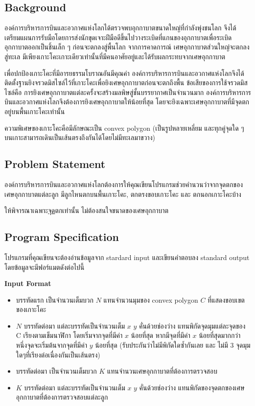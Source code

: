 
\subsection*{\sectionfont\upshape Background}

องค์การบริหารการบินและอวกาศแห่งโลกได้ตรวจพบอุกกาบาตขนาดใหญ่ที่กำลังพุ่งชนโลก 
จึงได้เตรียมแผนการรับมือโดยการส่งนักขุดเจาะฝีมือดีขึ้นไปวางระเบิดที่แกนของอุกกาบาตเพื่อระเบิดอุกกาบาตออกเป็นชิ้นเล็ก ๆ 
ก่อนจะตกลงสู่พื้นโลก จากการคาดการณ์ เศษอุกกาบาตส่วนใหญ่จะตกลงสู่ทะเล 
มีเพียงเกาะโคะเกาะเดียวเท่านั้นที่มีคนอาศัยอยู่และได้รับผลกระทบจากเศษอุกกาบาต

เพื่อปกป้องเกาะโคะที่มีอารยธรรมโบราณอันมีคุณค่า 
องค์การบริหารการบินและอวกาศแห่งโลกจึงได้ติดตั้งฐานยิงจรวดมิสไซล์ไว้ที่เกาะโคะเพื่อยิงเศษอุกกาบาตก่อนจะตกถึงพื้น
ข้อเสียของการใช้จรวดมิสไซล์คือ การยิงเศษอุกกาบาตแต่ละครั้งจะสร้างมลพิษสู่ชั้นบรรยากาศเป็นจำนวนมาก
องค์การบริหารการบินและอวกาศแห่งโลกจึงต้องการยิงเศษอุกกาบาตให้น้อยที่สุด
โดยจะยิงเฉพาะเศษอุกกาบาตที่มีจุดตกอยู่บนพื้นเกาะโคะเท่านั้น

ความพิเศษของเกาะโคะคือมีลักษณะเป็น convex polygon 
(เป็นรูปหลายเหลี่ยม และทุกคู่จุดใด ๆ บนเกาะสามารถเดินเป็นเส้นตรงถึงกันได้โดยไม่มีทะเลมาขวาง)

\subsection*{\sectionfont\upshape Problem Statement}

องค์การบริหารการบินและอวกาศแห่งโลกต้องการให้คุณเขียนโปรแกรมช่วยคำนวนว่าจากจุดตกของเศษอุกกาบาตแต่ละลูก 
มีลูกไหนตกบนพื้นเกาะโคะ, ตกตรงขอบเกาะโคะ และ ตกนอกเกาะโคะบ้าง

ให้พิจารณาเฉพาะ\uline{จุด}ตกเท่านั้น ไม่ต้องสนใจขนาดของเศษอุกกาบาต

\subsection*{\sectionfont\upshape Program Specification}

โปรแกรมที่คุณเขียนจะต้องอ่านข้อมูลจาก stardard input 
และเขียนคำตอบลง standard output โดยข้อมูลจะมีฟอร์แมตดังต่อไปนี้

\bigskip\noindent
{\sectionfont\bfseries Input Format}
\begin{itemize}
\item บรรทัดแรก เป็นจำนวนเต็มบวก $N$ แทนจำนวนมุมของ convex polygon $C$ ที่แสดงขอบเขตของเกาะโคะ
\item $N$ บรรทัดต่อมา แต่ละบรรทัดเป็นจำนวนเต็ม $x$ $y$ คั่นด้วยช่องว่าง 
    แทนพิกัดจุดมุมแต่ละจุดของ C เรียงตามเข็มนาฬิกา โดยเริ่มจากจุดที่มีค่า $x$ น้อยที่สุด 
    หากมีจุดที่มีค่า $x$ น้อยที่สุดมากกว่าหนึ่งจุดจะเริ่มต้นจากจุดที่มีค่า $y$ น้อยที่สุด 
    (รับประกันว่าไม่มีพิกัดใดซ้ำกันเลย และ ไม่มี 3 จุดมุมใดๆที่เรียงต่อเนื่องกันเป็นเส้นตรง)
\item บรรทัดต่อมา เป็นจำนวนเต็มบวก $K$ แทนจำนวนเศษอุกกาบาตที่ต้องการตรวจสอบ
\item $K$ บรรทัดต่อมา แต่ละบรรทัดเป็นจำนวนเต็ม $x$ $y$ คั่นด้วยช่องว่าง 
    แทนพิกัดของจุดตกของเศษอุกกาบาตที่ต้องการตรวจสอบแต่ละลูก
\end{itemize}

